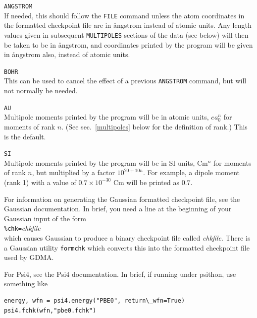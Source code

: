 \documentclass[12pt,txfonts]{paper}
\begin{document}
\hspace*{2 em}\verb/ANGSTROM/\\
If needed, this should follow the \verb+FILE+ command unless the atom
coordinates in 
the formatted checkpoint file are in {\aa}ngstrom instead of atomic units.
Any length values given in subsequent \verb+MULTIPOLES+ sections of the data
(see below) will then be taken to be in {\aa}ngstrom, and coordinates printed
by the program will be given in {\aa}ngstrom also, instead of atomic units.

\hspace*{2 em}\verb/BOHR/\\
This can be used to cancel the effect of a previous \verb/ANGSTROM/
command, but will not normally be needed.

\hspace*{2 em}\verb/AU/\\
Multipole moments printed by the program will be in atomic units,
$ea_0^n$ for moments of rank $n$. (See sec.~\ref{multipoles} below for
the definition of rank.) This is the default.

\hspace*{2 em}\verb/SI/\\
\label{SI}%
Multipole moments printed by the program will be in SI units, Cm$^n$
for moments of rank $n$, but multiplied by a factor $10^{20+10n}$. For
example, a dipole moment (rank 1) with a value of $0.7\times10^{-30}$
Cm will be printed as $0.7$.

For information on generating the Gaussian formatted checkpoint file,
see the Gaussian documentation. In brief, you need a line at the
beginning of your Gaussian input of the form\\
\hspace*{2 em}\verb:%chk=:\emph{chkfile}\\
which causes Gaussian to produce a binary checkpoint file called
\emph{chkfile}. There is a Gaussian utility \verb+formchk+ which
converts this into the formatted checkpoint file used by GDMA.

For Psi4, see the Psi4 documentation. In brief, if running under
psithon, use something like\\[6pt]
\hspace{1em}\begin{minipage}[c]{100mm}
\begin{verbatim}
energy, wfn = psi4.energy("PBE0", return\_wfn=True)
psi4.fchk(wfn,"pbe0.fchk")
\end{verbatim}
  \end{minipage}
\end{document}
